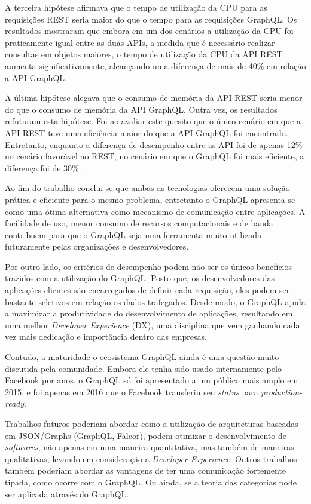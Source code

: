 A terceira hipótese afirmava que o tempo de utilização da CPU para as requisições REST seria maior do que o tempo para as requisições GraphQL. Os resultados mostraram que embora em um dos cenários a utilização da CPU foi praticamente igual entre as duas APIs, a medida que é necessário realizar consultas em objetos maiores, o tempo de utilização da CPU da API REST aumenta significativamente, alcançando uma diferença de mais de 40\% em relação a API GraphQL.

A última hipótese alegava que o consumo de memória da API REST seria menor do que o consumo de memória da API GraphQL. Outra vez, os resultados refutaram esta hipótese. Foi ao avaliar este quesito que o único cenário em que a API REST teve uma eficiência maior do que a API GraphQL foi encontrado. Entretanto, enquanto a diferença de desempenho entre as API foi de apenas 12\% no cenário favorável ao REST, no cenário em que o GraphQL foi mais eficiente, a diferença foi de 30\%. 

Ao fim do trabalho conclui-se que ambas as tecnologias oferecem uma solução prática e eficiente para o mesmo problema, entretanto o GraphQL apresenta-se como uma ótima alternativa como mecanismo de comunicação entre aplicações. A facilidade de uso, menor consumo de recursos computacionais e de banda contribuem para que o GraphQL seja uma ferramenta muito utilizada futuramente pelas organizações e desenvolvedores. 

Por outro lado, os critérios de desempenho podem não ser os únicos benefícios trazidos com a utilização do GraphQL. Posto que, os desenvolvedores das aplicações clientes são encarregados de definir cada requisição, eles podem ser bastante seletivos em relação os dados trafegados. Desde modo, o GraphQL ajuda a maximizar a produtividade do desenvolvimento de aplicações, resultando em uma melhor \textit{Developer Experience} (DX), uma disciplina que vem ganhando cada vez mais dedicação e importância dentro das empresas.

Contudo, a maturidade o ecosistema GraphQL ainda é uma questão muito discutida pela comunidade. Embora ele tenha sido usado internamente pelo Facebook por anos, o GraphQL só foi apresentado a um público mais amplo em 2015, e foi apenas em 2016 que o Facebook transferiu seu \textit{status} para \textit{production-ready}.

Trabalhos futuros poderiam abordar como a utilização de arquiteturas baseadas em JSON/Graphs (GraphQL, Falcor), podem otimizar o desenvolvimento de \textit{softwares}, não apenas em uma maneira quantitativa, mas também de maneiras qualitativas, levando em consideração a \textit{Developer Experience}. Outros trabalhos também poderiam abordar as vantagens de ter uma comunicação fortemente tipada, como ocorre com o GraphQL. Ou ainda, se a teoria das categorias pode ser aplicada através do GraphQL.
